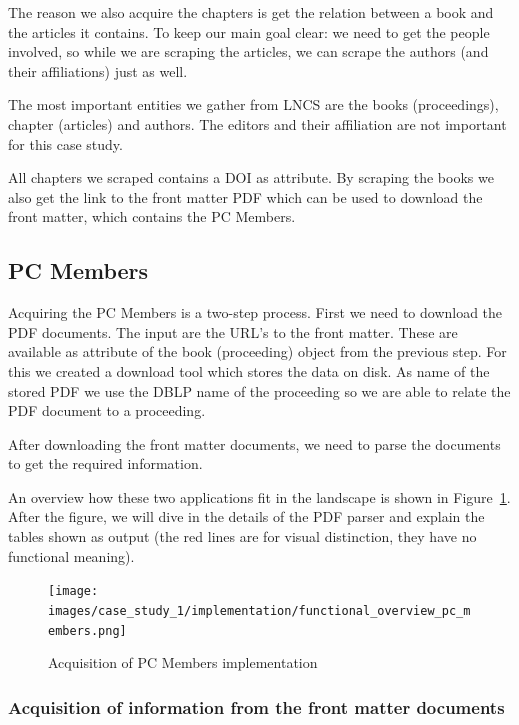\documentclass{ou-report}
\newcommand{\doi}{{DOI}}
\newcommand{\lncs}{LNCS}
\newcommand{\dblp}{DBLP}
\begin{document}
The reason we also acquire the chapters is get the relation between a book and
the articles it contains. To keep our main goal clear: we need to get the people
involved, so while we are scraping the articles, we can scrape the authors (and 
their affiliations) just as well.

The most important entities we gather from \lncs{} are the books (proceedings), 
chapter (articles) and authors. The editors and their affiliation are not 
important for this case study. 

All chapters we scraped contains a \doi{} as attribute. 
By scraping the books we also get the link to the front matter PDF which can be 
used to download the front matter, which contains the PC Members.

\subsection{PC Members}
\label{sec:front_matter_parsing}
Acquiring the PC Members is a two-step process. First we need to download the
PDF documents. The input are the URL's to the front matter. These are available
as attribute of the book (proceeding) object from the previous step. For this we 
created a download tool which stores the data on disk. As name of the stored 
PDF we use the \dblp{} name of the proceeding so we are able to relate the PDF 
document to a proceeding.

After downloading the front matter documents, we need to parse the documents to
get the required information.

An overview how these two applications fit in the landscape is shown in
Figure~\ref{fig:functional_overview_pc_members}. After the figure, we will dive in
the details of the PDF parser and explain the tables shown as output (the red lines
are for visual distinction, they have no functional meaning).

\begin{figure}[H]
    \centering
    \texttt{[image: images/case\_study\_1/implementation/functional\_overview\_pc\_members.png]}
    \caption{Acquisition of PC Members implementation}
    \label{fig:functional_overview_pc_members}
\end{figure}

\subsubsection{Acquisition of information from the front matter documents}
\end{document}
